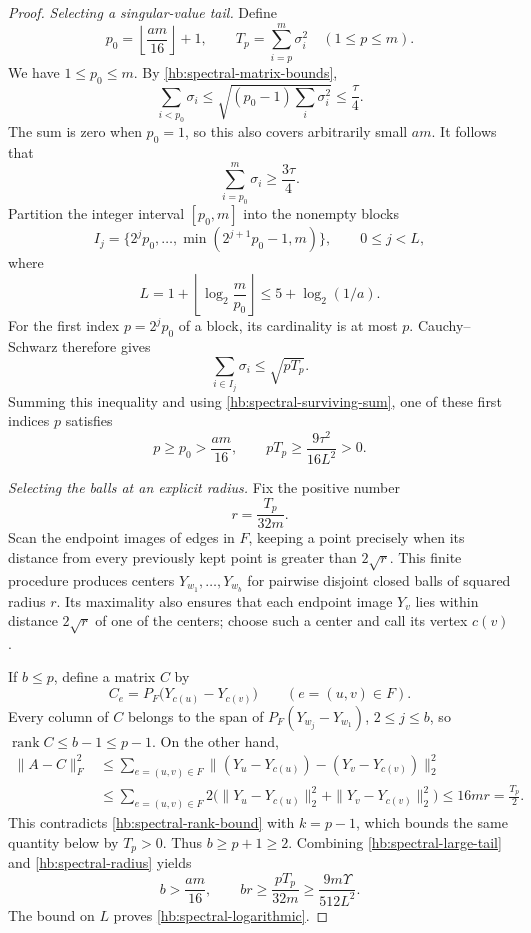 \documentclass[11pt]{amsart}
\theoremstyle{definition}
\theoremstyle{remark}
\numberwithin{equation}{section}
\begin{document}
\begin{proof}
 
 \emph{Selecting a singular-value tail.}
Define
\[
 p_0=\left\lfloor\frac{am}{16}\right\rfloor+1,
 \qquad T_p=\sum_{i=p}^m\sigma_i^2\quad(1\le p\le m).
\]
We have \(1\le p_0\le m\).  By \eqref{hb:spectral-matrix-bounds},
\[
 \sum_{i<p_0}\sigma_i
 \le\sqrt{(p_0-1)\sum_i\sigma_i^2}
 \le\frac\tau4.
\]
The sum is zero when \(p_0=1\), so this also covers arbitrarily small
\(am\).  It follows that
\begin{equation}\label{hb:spectral-surviving-sum}
 \sum_{i=p_0}^m\sigma_i\ge\frac{3\tau}{4}.
\end{equation}
Partition the integer interval \([p_0,m]\) into the nonempty blocks
\[
 I_j=\{2^jp_0,\ldots,\min(2^{j+1}p_0-1,m)\},
 \qquad 0\le j<L,
\]
where
\[
 L=1+\left\lfloor\log_2\frac m{p_0}\right\rfloor
 \le 5+\log_2(1/a).
\]
For the first index \(p=2^jp_0\) of a block, its cardinality is at
most \(p\).  Cauchy--Schwarz therefore gives
\[
 \sum_{i\in I_j}\sigma_i\le\sqrt{pT_p}.
\]
Summing this inequality and using
\eqref{hb:spectral-surviving-sum}, one of these first indices \(p\)
satisfies
\begin{equation}\label{hb:spectral-large-tail}
 p\ge p_0>\frac{am}{16},
 \qquad
 pT_p\ge\frac{9\tau^2}{16L^2}>0.
\end{equation}

 
 \emph{Selecting the balls at an explicit radius.}
Fix the positive number
\begin{equation}\label{hb:spectral-radius}
 r=\frac{T_p}{32m}.
\end{equation}
Scan the endpoint images of edges in \(F\), keeping a point precisely
when its distance from every previously kept point is greater than
\(2\sqrt r\).  This finite procedure produces centers
\(Y_{w_1},\ldots,Y_{w_b}\) for pairwise disjoint closed balls of
squared radius \(r\).  Its maximality also ensures that each endpoint
image \(Y_v\) lies within distance \(2\sqrt r\) of one of the
centers; choose such a center and call its vertex \(c(v)\).

If \(b\le p\), define a matrix \(C\) by
\[
 C_e=P_F\bigl(Y_{c(u)}-Y_{c(v)}\bigr)
 \qquad(e=(u,v)\in F).
\]
Every column of \(C\) belongs to the span of
\(P_F(Y_{w_j}-Y_{w_1})\), \(2\le j\le b\), so
\(\operatorname{rank} C\le b-1\le p-1\).  On the other hand,
\begin{align*}
 \|A-C\|_F^2
 &\le\sum_{e=(u,v)\in F}
 \bigl\|(Y_u-Y_{c(u)})-(Y_v-Y_{c(v)})\bigr\|_2^2\\
 &\le\sum_{e=(u,v)\in F}
 2\bigl(\|Y_u-Y_{c(u)}\|_2^2+
          \|Y_v-Y_{c(v)}\|_2^2\bigr)
 \le16mr=\frac{T_p}{2}.
\end{align*}
This contradicts \eqref{hb:spectral-rank-bound} with \(k=p-1\),
which bounds the same quantity below by \(T_p>0\).
Thus \(b\ge p+1\ge2\).  Combining
\eqref{hb:spectral-large-tail} and \eqref{hb:spectral-radius} yields
\[
 b>\frac{am}{16},
 \qquad
 br\ge\frac{pT_p}{32m}
 \ge\frac{9m\Upsilon}{512L^2}.
\]
The bound on \(L\) proves \eqref{hb:spectral-logarithmic}.


\end{proof}
\end{document}
